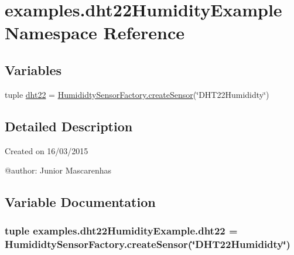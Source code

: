 \hypertarget{namespaceexamples_1_1dht22HumidityExample}{}\section{examples.\+dht22\+Humidity\+Example Namespace Reference}
\label{namespaceexamples_1_1dht22HumidityExample}
\subsection*{Variables}
\begin{DoxyCompactItemize}
\item 
tuple \hyperlink{namespaceexamples_1_1dht22HumidityExample_ab51d647bfea728dc90a3674a0401cedb}{dht22} = \hyperlink{classconcretefactory_1_1humiditySensorFactory_1_1HumididtySensorFactory_a591e773357247fd00a760fa160d7b231}{Humididty\+Sensor\+Factory.\+create\+Sensor}(\char`\"{}D\+H\+T22\+Humididty\char`\"{})
\end{DoxyCompactItemize}


\subsection{Detailed Description}
\begin{DoxyVerb}Created on 16/03/2015

@author: Junior Mascarenhas
\end{DoxyVerb}
 

\subsection{Variable Documentation}
\hypertarget{namespaceexamples_1_1dht22HumidityExample_ab51d647bfea728dc90a3674a0401cedb}{}
\subsubsection[{dht22}]{\setlength{\rightskip}{0pt plus 5cm}tuple examples.\+dht22\+Humidity\+Example.\+dht22 = {\bf Humididty\+Sensor\+Factory.\+create\+Sensor}(\char`\"{}D\+H\+T22\+Humididty\char`\"{})}\label{namespaceexamples_1_1dht22HumidityExample_ab51d647bfea728dc90a3674a0401cedb}
